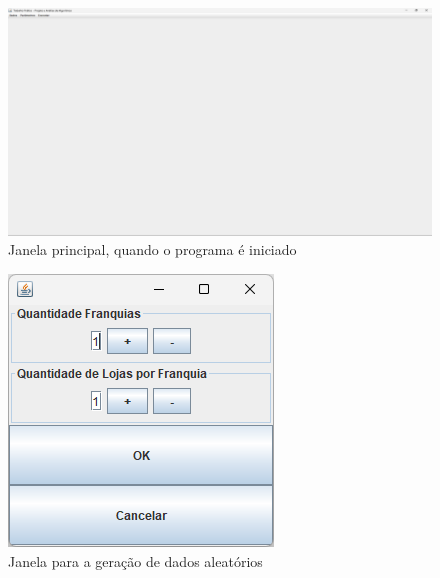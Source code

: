 \documentclass[12pt]{article}
\begin{document}
\begin{figure}
    \centering
    \includegraphics[width=\textwidth]{Captura de tela 2024-06-01 110824}
    \caption{Janela principal, quando o programa é iniciado}
    \label{fig:fig-1}
\end{figure}

\begin{figure}
    \centering
    \includegraphics[width=\textwidth]{Captura de tela 2024-06-01 110836}
    \caption{Janela para a geração de dados aleatórios}
    \label{fig:fig-2}
\end{figure}
\end{document}
